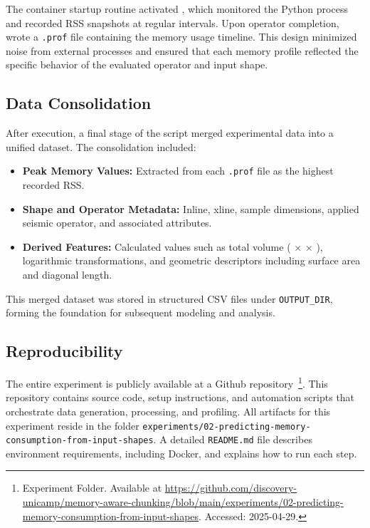 The container startup routine activated \traceq, which monitored the Python process and recorded \ac{RSS} snapshots at regular intervals.
Upon operator completion, \traceq wrote a \texttt{.prof} file containing the memory usage timeline.
This design minimized noise from external processes and ensured that each memory profile reflected the specific behavior of the evaluated operator and input shape.

\subsection{Data Consolidation}
\label{subsec:data-consolidation}

After execution, a final stage of the script merged experimental data into a unified dataset.
The consolidation included:

\begin{itemize}
    \item \textbf{Peak Memory Values:} Extracted from each \texttt{.prof} file as the highest recorded \ac{RSS}.
    \item \textbf{Shape and Operator Metadata:} Inline, xline, sample dimensions, applied seismic operator, and associated attributes.
    \item \textbf{Derived Features:} Calculated values such as total volume ( $\times$  $\times$ ), logarithmic transformations, and geometric descriptors including surface area and diagonal length.
\end{itemize}

This merged dataset was stored in structured \ac{CSV} files under \texttt{OUTPUT\_DIR}, forming the foundation for subsequent modeling and analysis.

\subsection{Reproducibility}
\label{subsec:reproducibility}

The entire experiment is publicly available at a Github repository~\footnote{Experiment Folder. Available at \url{https://github.com/discovery-unicamp/memory-aware-chunking/blob/main/experiments/02-predicting-memory-consumption-from-input-shapes}. Accessed: 2025-04-29.}.
This repository contains source code, setup instructions, and automation scripts that orchestrate data generation, processing, and profiling.
All artifacts for this experiment reside in the folder \texttt{experiments/02-predicting-memory-consumption-from-input-shapes}.
A detailed \texttt{README.md} file describes environment requirements, including Docker, and explains how to run each step.

